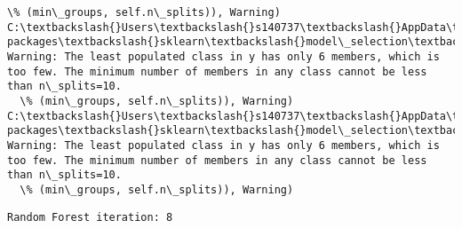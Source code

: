 \documentclass[11pt]{article}
\begin{document}
\begin{Verbatim}[commandchars=\\\{\}]
  \% (min\_groups, self.n\_splits)), Warning)
C:\textbackslash{}Users\textbackslash{}s140737\textbackslash{}AppData\textbackslash{}Local\textbackslash{}Continuum\textbackslash{}anaconda3\textbackslash{}lib\textbackslash{}site-packages\textbackslash{}sklearn\textbackslash{}model\_selection\textbackslash{}\_split.py:605: Warning: The least populated class in y has only 6 members, which is too few. The minimum number of members in any class cannot be less than n\_splits=10.
  \% (min\_groups, self.n\_splits)), Warning)
C:\textbackslash{}Users\textbackslash{}s140737\textbackslash{}AppData\textbackslash{}Local\textbackslash{}Continuum\textbackslash{}anaconda3\textbackslash{}lib\textbackslash{}site-packages\textbackslash{}sklearn\textbackslash{}model\_selection\textbackslash{}\_split.py:605: Warning: The least populated class in y has only 6 members, which is too few. The minimum number of members in any class cannot be less than n\_splits=10.
  \% (min\_groups, self.n\_splits)), Warning)

    \end{Verbatim}

    \begin{Verbatim}[commandchars=\\\{\}]
Random Forest iteration: 8 

    \end{Verbatim}
\end{document}
